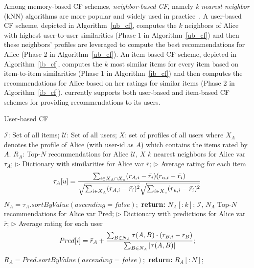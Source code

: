 Among memory-based CF schemes, \emph{neighbor-based CF}, namely \emph{k nearest neighbor} (kNN) algorithms are more popular and widely used in practice~\cite{sarwar2001item}. A user-based CF scheme, depicted in Algorithm~\ref{ub_cf}, computes the $k$ neighbors of Alice with highest user-to-user similarities (Phase 1 in Algorithm~\ref{ub_cf}) and then these neighbors' profiles are leveraged to compute the best recommendations for Alice (Phase 2 in Algorithm~\ref{ub_cf}). An item-based CF scheme, depicted in Algorithm~\ref{ib_cf}, computes the $k$ most similar items for every item based on item-to-item similarities (Phase 1 in Algorithm~\ref{ib_cf}) and then computes the recommendations for Alice based on her ratings for similar items (Phase 2 in Algorithm~\ref{ib_cf}). {\color{red}\crossrec currently supports both user-based and item-based CF schemes for providing recommendations to its users.}
\vspace{2mm}



\begin{algorithm}[ht]
\caption{User-based CF}\label{ub_cf}
\begin{algorithmic}[1]
\Require $\mathcal{I}$: Set of all items; $\mathcal{U}$: Set of all users; $X$: set of profiles of all users where $X_A$ denotes the profile of Alice (with user-id as $A$) which contains the items rated by $A$.
\Ensure $R_A$: Top-$N$ recommendations for Alice
\Require $\mathcal{U}$, $X$
\Ensure $k$ nearest neighbors for Alice
\State var $\tau_A$;		\hfill $\rhd$ Dictionary with similarities for Alice
\State var $\bar{r}$; \hfill $\rhd$ Average rating for each item
\State \vspace{-4mm}
\begin{equation}
\vspace{-2mm}
\label{tau_ub_cf}
\tau_A[u]=\frac{\sum _{i \in X_A \cap X_u} (r_{A,i} - \bar{r_i})(r_{u,i} - \bar{r_i})}{\sqrt{\sum _{i \in X_A} (r_{A,i} - \bar{r_i})^2}\sqrt{\sum _{i \in X_u} (r_{u,i} - \bar{r_i})^2}}
\end{equation}
\EndFor
\State $N_{A}=\tau_A.sortByValue(ascending=false);$
\State \textbf{return:} $N_{A}[:k]$;
\Require $\mathcal{I}$, $N_A$ 
\Ensure Top-$N$ recommendations for Alice
\State var Pred; \hfill $\rhd$ Dictionary with predictions for Alice
\State var $\bar{r}$; \hfill $\rhd$ Average rating for each user
\State \vspace{-4mm}
\begin{equation}
\vspace{-2mm}
\label{pred_ub_cf}
Pred[i]=\bar{r}_{A} +\frac{\sum_{B \in N_{A}} \tau(A,B) \cdot (r_{B,i}- \bar{r}_B)}{\sum_{B \in N_{A}} |\tau(A,B)| } ;
\end{equation}
\EndFor
\State $R_{A}=Pred.sortByValue(ascending=false);$
\State \textbf{return:} $R_{A}[:N]$;
\end{algorithmic}
\end{algorithm}

